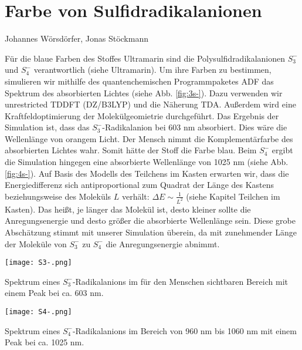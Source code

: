\section{Farbe von Sulfidradikalanionen}
Johannes Wörsdörfer, Jonas Stöckmann

Für die blaue Farben des Stoffes Ultramarin sind die Polysulfidradikalanionen $S_3 ^{-}$ und $S_4 ^{-}$ verantwortlich (siehe Ultramarin). Um ihre Farben zu bestimmen, simulieren wir mithilfe des quantenchemischen Programmpaketes ADF \cite{ADF} das Spektrum des absorbierten Lichtes (siehe Abb. \ref{fig:3s-}). Dazu verwenden wir unrestricted TDDFT (DZ/B3LYP) und die Näherung TDA. Außerdem wird eine Kraftfeldoptimierung der Molekülgeomietrie durchgeführt. Das Ergebnis der Simulation ist, dass das $S_3^{-}$-Radikalanion bei 603 nm absorbiert. Dies wäre die Wellenlänge von orangem Licht. Der Mensch nimmt die Komplementärfarbe des absorbierten Lichtes wahr. Somit hätte der Stoff die Farbe blau. Beim $S_4^{-}$ ergibt die Simulation hingegen eine absorbierte Wellenlänge von 1025 nm (siehe Abb. \ref{fig:4s-}).
Auf Basis des Modells des Teilchens im Kasten erwarten wir, dass die Energiedifferenz sich antiproportional zum Quadrat der Länge des Kastens beziehungsweise des Moleküls $L$ verhält: $\Delta E \sim \frac{1}{L^2}$ (siehe Kapitel Teilchen im Kasten). Das heißt, je länger das Molekül ist, desto kleiner sollte die Anregungsenergie und desto größer die absorbierte Wellenlänge sein. Diese grobe Abschätzung stimmt mit unserer Simulation überein, da mit zunehmender Länge der Moleküle von $S_3^{-}$ zu $S_4^{-}$ die Anregungsenergie abnimmt.


\begin{dsafigure}
 \centering
 \texttt{[image: S3-.png]}
 \caption{Spektrum eines $S_3^{-}$-Radikalanions im für den Menschen sichtbaren Bereich mit einem Peak bei ca. 603 nm.}
 \label{fig:3s-}
\end{dsafigure}

\begin{dsafigure}
 \centering
 \texttt{[image: S4-.png]}
 \caption{Spektrum eines $S_4^{-}$-Radikalanions im Bereich von 960 nm bis 1060 nm mit einem Peak bei ca. 1025 nm.}
 \label{fig:4s-}
\end{dsafigure}
